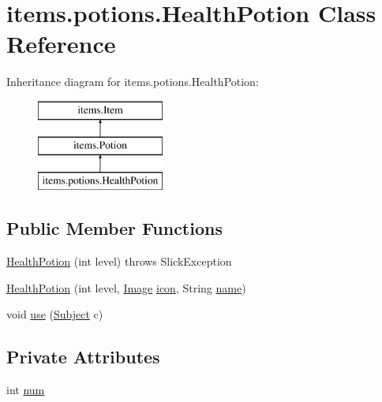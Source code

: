 \hypertarget{classitems_1_1potions_1_1_health_potion}{}\section{items.\+potions.\+Health\+Potion Class Reference}
\label{classitems_1_1potions_1_1_health_potion}
Inheritance diagram for items.\+potions.\+Health\+Potion\+:\begin{figure}[H]
\begin{center}
\leavevmode
\includegraphics[height=3.000000cm]{classitems_1_1potions_1_1_health_potion}
\end{center}
\end{figure}
\subsection*{Public Member Functions}
\begin{DoxyCompactItemize}
\item 
\mbox{\hyperlink{classitems_1_1potions_1_1_health_potion_aa30dccefeb52e5252ca039caa75d0f5b}{Health\+Potion}} (int level)  throws Slick\+Exception 
\item 
\mbox{\hyperlink{classitems_1_1potions_1_1_health_potion_a97a24952f4c52ebdf37662bbd7f785a7}{Health\+Potion}} (int level, \mbox{\hyperlink{classorg_1_1newdawn_1_1slick_1_1_image}{Image}} \mbox{\hyperlink{classitems_1_1_item_afa445ad011d48c3455b0c04bec2581f9}{icon}}, String \mbox{\hyperlink{classitems_1_1_item_a086327df1ba046bbbe3fa2f753226d73}{name}})
\item 
void \mbox{\hyperlink{classitems_1_1potions_1_1_health_potion_af43faa8c41c3ce2dd49f3a5e992468ba}{use}} (\mbox{\hyperlink{classentities_1_1_subject}{Subject}} c)
\end{DoxyCompactItemize}
\subsection*{Private Attributes}
\begin{DoxyCompactItemize}
\item 
int \mbox{\hyperlink{classitems_1_1potions_1_1_health_potion_a0d748e2dc730a38bab9f68ef71003a03}{num}}
\end{DoxyCompactItemize}
